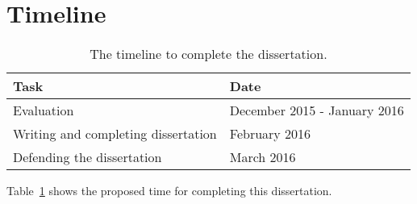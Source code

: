 \section{Timeline}

\begin{table}
	\def\arraystretch{2}
	\centering
	\begin{tabular}{| l | l |}
		\hline
		Task & Date \\ \hline
		Evaluation & December 2015 - January 2016\\
		\hline
		Writing and completing dissertation & February 2016 \\
		\hline
		Defending the dissertation & March 2016 \\
		\hline
	\end{tabular}
	\caption{The timeline to complete the dissertation.}
	\label{tab:table_timeline}
\end{table}

Table~\ref{tab:table_timeline} shows the proposed time for completing this dissertation.
